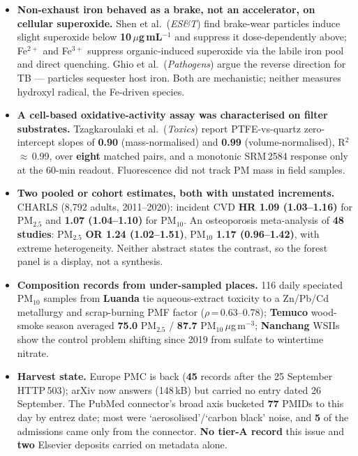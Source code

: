 \documentclass[10pt]{article}
\begin{document}
\footnotesize
\begin{itemize}

\item \textbf{Non-exhaust iron behaved as a brake, not an accelerator, on cellular superoxide.} Shen
et al.\ (\textit{ES\&T}) find brake-wear particles induce slight superoxide below
\textbf{10\,$\mu$g\,mL$^{-1}$} and suppress it dose-dependently above; Fe$^{2+}$ and Fe$^{3+}$
suppress organic-induced superoxide via the labile iron pool and direct quenching. Ghio et al.\
(\textit{Pathogens}) argue the reverse direction for TB --- particles sequester host iron. Both
are mechanistic; neither measures hydroxyl radical, the Fe-driven species.

\item \textbf{A cell-based oxidative-activity assay was characterised on filter substrates.}
Tzagkaroulaki et al.\ (\textit{Toxics}) report PTFE-vs-quartz zero-intercept slopes of
\textbf{0.90} (mass-normalised) and \textbf{0.99} (volume-normalised), R$^2$\,$\approx$\,0.99, over
\textbf{eight} matched pairs, and a monotonic SRM\,2584 response only at the 60-min readout.
Fluorescence did not track PM mass in field samples.

\item \textbf{Two pooled or cohort estimates, both with unstated increments.} CHARLS (8,792 adults,
2011--2020): incident CVD \textbf{HR 1.09 (1.03--1.16)} for PM$_{2.5}$ and \textbf{1.07
(1.04--1.10)} for PM$_{10}$. An osteoporosis meta-analysis of \textbf{48 studies}: PM$_{2.5}$
\textbf{OR 1.24 (1.02--1.51)}, PM$_{10}$ \textbf{1.17 (0.96--1.42)}, with extreme heterogeneity.
Neither abstract states the contrast, so the forest panel is a display, not a synthesis.

\item \textbf{Composition records from under-sampled places.} 116 daily speciated PM$_{10}$ samples
from \textbf{Luanda} tie aqueous-extract toxicity to a Zn/Pb/Cd metallurgy and scrap-burning PMF
factor ($\rho$\,=\,0.63--0.78); \textbf{Temuco} wood-smoke season averaged \textbf{75.0}
PM$_{2.5}$ / \textbf{87.7} PM$_{10}$\,$\mu$g\,m$^{-3}$; \textbf{Nanchang} WSIIs show the control
problem shifting since 2019 from sulfate to wintertime nitrate.

\item \textbf{Harvest state.} Europe PMC is back (\textbf{45} records after the 25 September
HTTP\,503); arXiv now answers (148\,kB) but carried no entry dated 26 September. The PubMed
connector's broad axis bucketed \textbf{77} PMIDs to this day by entrez date; most were
`aerosolised'/`carbon black' noise, and \textbf{5} of the admissions came only from the connector.
\textbf{No tier-A record} this issue and \textbf{two} Elsevier deposits carried on metadata alone.

\end{itemize}
\end{document}
